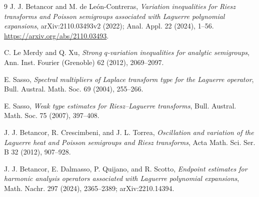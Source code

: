 \documentclass[11pt]{article}
\begin{document}
\begin{thebibliography}{9}
J. J. Betancor and M. de Le\'on-Contreras,
\emph{Variation inequalities for Riesz transforms and Poisson semigroups associated with Laguerre polynomial expansions},
arXiv:2110.03493v2 (2022); Anal. Appl. 22 (2024), 1--56.
\url{https://arxiv.org/abs/2110.03493}.

C. Le Merdy and Q. Xu,
\emph{Strong $q$-variation inequalities for analytic semigroups},
Ann. Inst. Fourier (Grenoble) 62 (2012), 2069--2097.

E. Sasso,
\emph{Spectral multipliers of Laplace transform type for the Laguerre operator},
Bull. Austral. Math. Soc. 69 (2004), 255--266.

E. Sasso,
\emph{Weak type estimates for Riesz--Laguerre transforms},
Bull. Austral. Math. Soc. 75 (2007), 397--408.

J. J. Betancor, R. Crescimbeni, and J. L. Torrea,
\emph{Oscillation and variation of the Laguerre heat and Poisson semigroups and Riesz transforms},
Acta Math. Sci. Ser. B 32 (2012), 907--928.

J. J. Betancor, E. Dalmasso, P. Quijano, and R. Scotto,
\emph{Endpoint estimates for harmonic analysis operators associated with Laguerre polynomial expansions},
Math. Nachr. 297 (2024), 2365--2389; arXiv:2210.14394.
\end{thebibliography}
\end{document}
